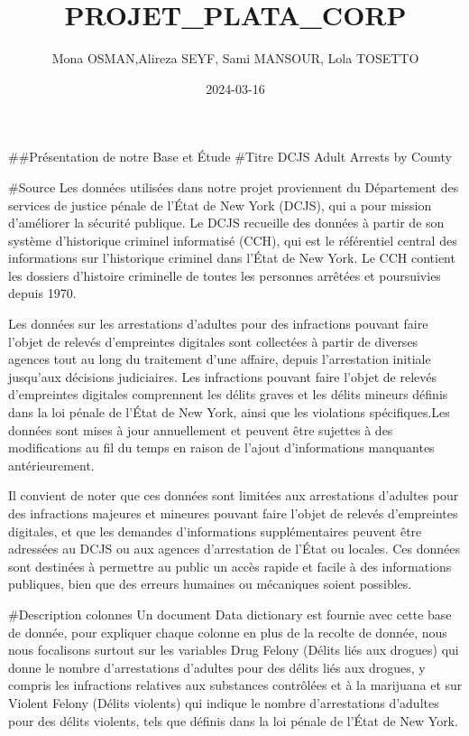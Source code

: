 \documentclass[
]{article}
\title{PROJET\_PLATA\_CORP}
\author{Mona OSMAN,Alireza SEYF, Sami MANSOUR, Lola TOSETTO}
\date{2024-03-16}
\begin{document}
\maketitle

\#\#Présentation de notre Base et Étude \#Titre DCJS Adult Arrests by
County

\#Source Les données utilisées dans notre projet proviennent du
Département des services de justice pénale de l'État de New York (DCJS),
qui a pour mission d'améliorer la sécurité publique. Le DCJS recueille
des données à partir de son système d'historique criminel informatisé
(CCH), qui est le référentiel central des informations sur l'historique
criminel dans l'État de New York. Le CCH contient les dossiers
d'histoire criminelle de toutes les personnes arrêtées et poursuivies
depuis 1970.

Les données sur les arrestations d'adultes pour des infractions pouvant
faire l'objet de relevés d'empreintes digitales sont collectées à partir
de diverses agences tout au long du traitement d'une affaire, depuis
l'arrestation initiale jusqu'aux décisions judiciaires. Les infractions
pouvant faire l'objet de relevés d'empreintes digitales comprennent les
délits graves et les délits mineurs définis dans la loi pénale de l'État
de New York, ainsi que les violations spécifiques.Les données sont mises
à jour annuellement et peuvent être sujettes à des modifications au fil
du temps en raison de l'ajout d'informations manquantes antérieurement.

Il convient de noter que ces données sont limitées aux arrestations
d'adultes pour des infractions majeures et mineures pouvant faire
l'objet de relevés d'empreintes digitales, et que les demandes
d'informations supplémentaires peuvent être adressées au DCJS ou aux
agences d'arrestation de l'État ou locales. Ces données sont destinées à
permettre au public un accès rapide et facile à des informations
publiques, bien que des erreurs humaines ou mécaniques soient possibles.

\#Description colonnes Un document Data dictionary est fournie avec
cette base de donnée, pour expliquer chaque colonne en plus de la
recolte de donnée, nous nous focalisons surtout sur les variables Drug
Felony (Délits liés aux drogues) qui donne le nombre d'arrestations
d'adultes pour des délits liés aux drogues, y compris les infractions
relatives aux substances contrôlées et à la marijuana et sur Violent
Felony (Délits violents) qui indique le nombre d'arrestations d'adultes
pour des délits violents, tels que définis dans la loi pénale de l'État
de New York.
\end{document}
